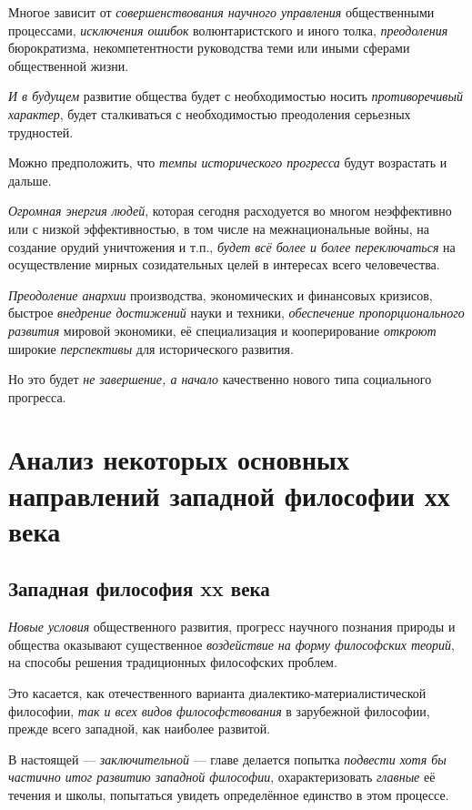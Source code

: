 \documentclass[a4paper,14pt,russian]{extreport}
\begin{document}
Многое зависит от \emph{совершенствования научного управления} общественными процессами, \emph{исключения ошибок} волюнтаристского и иного толка, \emph{преодоления} бюрократизма, некомпетентности руководства теми или иными сферами общественной жизни.

\emph{И в будущем} развитие общества будет с необходимостью носить \emph{противоречивый характер}, будет сталкиваться с необходимостью преодоления серьезных трудностей.

Можно предположить, что \emph{темпы исторического прогресса} будут возрастать и дальше.

\emph{Огромная энергия людей}, которая сегодня расходуется во многом неэффективно или с низкой эффективностью, в том числе на межнациональные войны, на создание орудий уничтожения и т.п., \emph{будет всё более и более переключаться} на осуществление мирных созидательных целей в интересах всего человечества.

\emph{Преодоление анархии} производства, экономических и финансовых кризисов, быстрое \emph{внедрение достижений} науки и техники, \emph{обеспечение пропорционального развития} мировой экономики, её специализация и кооперирование \emph{откроют} широкие \emph{перспективы} для исторического развития.

Но это будет \emph{не завершение, а начало} качественно нового типа социального прогресса.

\chapter{Анализ некоторых основных направлений западной философии хх века}

\section{Западная философия xx века}

\emph{Новые условия} общественного развития, прогресс научного познания природы и общества оказывают существенное \emph{воздействие} \emph{на форму философских теорий}, на способы решения традиционных философских проблем.

Это касается, как отечественного варианта диалектико-материалистической философии, \emph{так и всех видов философствования} в зарубежной философии, прежде всего западной, как наиболее развитой.

В настоящей --- \emph{заключительной} --- главе делается попытка \emph{подвести хотя бы частично итог развитию западной философии}, охарактеризовать \emph{главные} её течения и школы, попытаться увидеть определённое единство в этом процессе.
\end{document}
